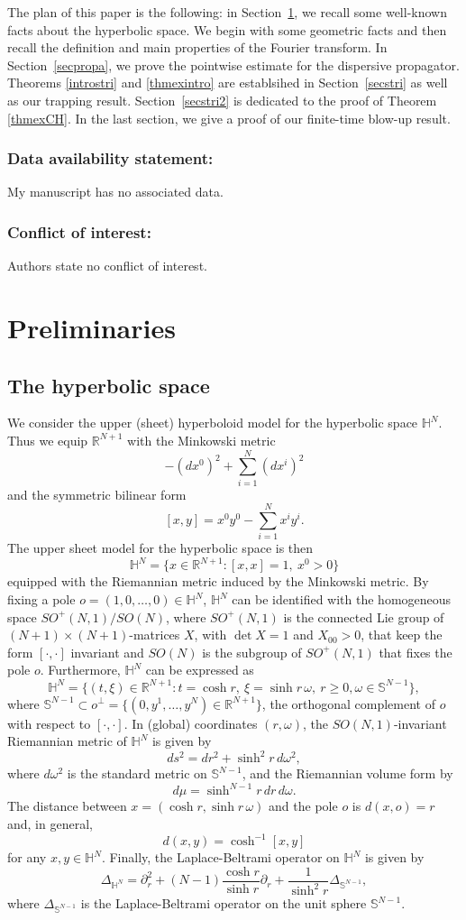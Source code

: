 \documentclass[10pt,leqno]{amsart}
\numberwithin{equation}{section}
\newcommand{\field}[1]{\mathbb{#1}}
\newcommand{\R}{\field{R}}          		%
\newcommand{\Sph}{\field{S}}        		%
\newcommand{\Hy}{\field{H}}
\begin{document}
The plan of this paper is the following: in Section~\ref{secprel}, we recall some well-known facts about the hyperbolic space. We begin with some geometric facts and then recall the definition and main properties of the Fourier transform. In Section~\ref{secpropa}, we prove the pointwise estimate for the dispersive propagator. Theorems \ref{introstri} and \ref{thmexintro} are establsihed in Section~\ref{secstri} as well as our trapping result. Section~\ref{secstri2} is dedicated to the proof of Theorem \ref{thmexCH}. In the last section, we give a proof of our finite-time blow-up result. 

\subsubsection*{Data availability statement:}
My manuscript has no associated data.

\subsubsection*{Conflict of interest:}
  Authors state no conflict of  interest. 



\section{Preliminaries}\label{secprel}
\subsection{The hyperbolic space}
We consider the upper (sheet) hyperboloid model for the hyperbolic space $\Hy^N$. Thus we equip $\R^{N+1}$ with 
the Minkowski metric 
\[
-(dx^0)^2+\sum_{i=1}^N (dx^i)^2
\]
and the symmetric bilinear form
\[
[x,y]= x^0y^0 -\sum_{i=1}^N
x^iy^i.
\]
The upper sheet model for the hyperbolic space is then 
\[
\Hy^N=\{x\in\R^{N+1}\colon [x,x]=1,\ x^0>0\}
\]
equipped with the Riemannian metric induced by the Minkowski metric. By fixing a pole $o=(1,0,\ldots,0)\in\Hy^N$,  $\Hy^N$ can be identified with the homogeneous space $SO^{+}(N,1)/SO(N)$, where $SO^{+}(N,1)$ is the connected Lie group of $(N+1)\times (N+1)$-matrices $X$, with $\det X=1$ and $X_{00}>0$, that keep the form $[\cdot,\cdot]$ invariant and $SO(N)$ is the subgroup of $SO^{+}(N,1)$ that fixes the pole $o$. 
Furthermore, $\Hy^N$ can be expressed as
\[
\Hy^N=\{(t,\xi)\in\R^{N+1}\colon t=\cosh r,\ \xi=\sinh r\,\omega,\ r\ge 0,\omega\in\Sph^{N-1}\},
\]
where $\Sph^{N-1}\subset o^{\perp}=\{(0,y^1,\ldots,y^N)\in \R^{N+1}\}$, the orthogonal complement of $o$ with respect to $[\cdot,\cdot]$. In (global) coordinates $(r,\omega)$, 
the $SO(N,1)$-invariant Riemannian metric of $\Hy^N$ is given by  
\[
ds^2 = dr^2 + \sinh^2 r\, d\omega^2,
\]
where $d\omega^2$ is the standard metric on $\Sph^{N-1}$, and the Riemannian volume form by 
\[
d\mu=\sinh^{N-1}r\,dr\,d\omega.
\]
The distance between $x=(\cosh r,\sinh r\,\omega)$ and the pole $o$ is $d(x,o)=r$ and, in general,
\[
d(x,y)=\cosh^{-1}[x,y]
\]
for any $x,y\in\Hy^N$. 
Finally, the Laplace-Beltrami operator on $\Hy^N$ is given by
\[
\Delta_{\Hy^N}=\partial_r^2 +(N-1)\frac{\cosh r}{\sinh r}\partial_r
+\frac{1}{\sinh^2 r}\Delta_{\Sph^{N-1}},
\]
where $\Delta_{\Sph^{N-1}}$ is the Laplace-Beltrami operator on the unit sphere $\Sph^{N-1}$.
\end{document}
